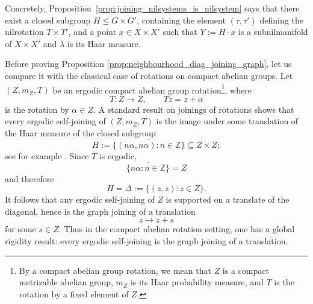 \documentclass[12pt]{amsart}
\theoremstyle{plain}
\theoremstyle{definition}
\newcommand\Z{\mathbb{Z}}
\begin{document}
Concretely, Proposition~\ref{prop:joining_nilsystems_is_nilsystem} says that there exist a closed subgroup $H \leq G\times G'$, containing the element $(\tau,\tau')$ defining the nilrotation $T\times T'$, and a point $x\in X\times X'$ such that $Y := H\cdot x$ is a subnilmanifold of $X \times X'$ and $\lambda$ is its Haar measure. 

Before proving Proposition \ref{prop:neighbourhood_diag_joining_graph}, let us compare it with the classical case of rotations on compact abelian groups. 
Let  $(Z, m_Z, T)$ be an ergodic compact abelian group rotation\footnote{By a compact abelian group rotation, we mean that $Z$ is a compact metrizable abelian group, $m_Z$ is its Haar probability measure, and $T$ is the rotation by a fixed element of $Z$.}, where
\[T \colon Z \to Z, \qquad T z = z + \alpha\]
is the rotation by $\alpha \in Z$. 
A standard result on joinings of rotations shows that every ergodic self-joining of $(Z, m_Z, T)$ is the image under some translation of the Haar measure of the closed subgroup
\[
H := \overline{\{(n\alpha, n\alpha) : n \in \Z\}} \subseteq Z \times Z;
\]
see for example \cite[Chapter 4, Proposition 7]{hk-book}.
Since $T$ is ergodic,
\[
\overline{\{n \alpha : n \in \Z\}} = Z
\]
and therefore 
\[
H = \Delta := \{(z, z) : z \in Z\}.
\]
It follows that any ergodic self-joining of $Z$ is supported on a translate of the diagonal, hence is the graph joining of a translation 
\[z \mapsto z + s\]
for some $s \in Z$.
Thus in the compact abelian rotation setting, one has a global rigidity result: every ergodic self-joining is the graph joining of a translation. 
\end{document}
